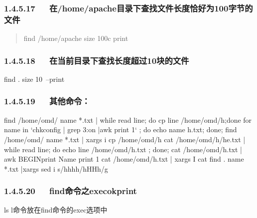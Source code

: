 \documentclass[letterpaper,12pt,english]{sphinxmanual}
\begin{document}
\subsubsection{1.4.5.17   在/home/apache目录下查找文件长度恰好为100字节的文件}
\label{\detokenize{001software/001install/linux:home-apache100}}\begin{quote}

find /home/apache \sphinxhyphen{}size 100c \sphinxhyphen{}print
\end{quote}


\subsubsection{1.4.5.18   在当前目录下查找长度超过10块的文件}
\label{\detokenize{001software/001install/linux:id17}}
\begin{sphinxVerbatim}[commandchars=\\\{\}]
find . \PYGZhy{}size 10 –print
\end{sphinxVerbatim}


\subsubsection{1.4.5.19   其他命令：}
\label{\detokenize{001software/001install/linux:id18}}
\begin{sphinxVerbatim}[commandchars=\\\{\}]
find /home/omd/ \PYGZhy{}name *.txt | while read line; do cp \PYGZdl{}line /home/omd/h;done
for name in `chkconfig | grep 3:on |awk \PYGZsq{}\PYGZob{}print \PYGZdl{}1\PYGZcb{}\PYGZsq{}` ; do echo \PYGZdl{}name \PYGZgt{}\PYGZgt{} h.txt; done;
find /home/omd/ \PYGZhy{}name *.txt | xargs \PYGZhy{}i cp \PYGZob{}\PYGZcb{} /home/omd/h
cat /home/omd/h/he.txt | while read line; do echo \PYGZdl{}line \PYGZgt{}\PYGZgt{} /home/omd/h.txt ; done;
cat /home/omd/h.txt | awk \PYGZsq{}BEGIN\PYGZob{}print \PYGZdq{}Name \PYGZdq{}\PYGZcb{} \PYGZob{}print \PYGZdl{}1\PYGZcb{}\PYGZsq{}
cat /home/omd/h.txt | xargs \PYGZhy{}I \PYGZob{}\PYGZcb{} cat \PYGZob{}\PYGZcb{}
find . \PYGZhy{}name  \PYGZdq{}*.txt\PYGZdq{} |xargs   sed \PYGZhy{}i \PYGZsq{}s/hhhh/\PYGZbs{}hHHh/g\PYGZsq{}
\end{sphinxVerbatim}


\subsubsection{1.4.5.20   find命令之execokprint}
\label{\detokenize{001software/001install/linux:findexecokprint}}
ls \sphinxhyphen{}l命令放在find命令的\sphinxhyphen{}exec选项中
\end{document}
